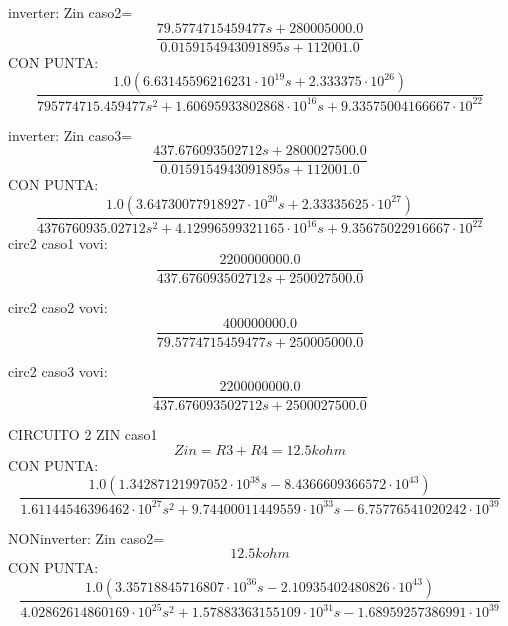 inverter: Zin caso2=
\begin{equation}
\frac{79.5774715459477 s + 280005000.0}{0.0159154943091895 s + 112001.0}
\end{equation}
CON PUNTA:
\begin{equation}
\frac{1.0 \left(6.63145596216231 \cdot 10^{19} s + 2.333375 \cdot 10^{26}\right)}{795774715.459477 s^{2} + 1.60695933802868 \cdot 10^{16} s + 9.33575004166667 \cdot 10^{22}}
\end{equation}

inverter: Zin caso3=
\begin{equation}
\frac{437.676093502712 s + 2800027500.0}{0.0159154943091895 s + 112001.0}
\end{equation}
CON PUNTA:
\begin{equation}
\frac{1.0 \left(3.64730077918927 \cdot 10^{20} s + 2.33335625 \cdot 10^{27}\right)}{4376760935.02712 s^{2} + 4.12996599321165 \cdot 10^{16} s + 9.35675022916667 \cdot 10^{22}}
\end{equation}
circ2 caso1 vovi:
\begin{equation}
\frac{2200000000.0}{437.676093502712 s + 250027500.0}
\end{equation}

circ2 caso2 vovi:
\begin{equation}
\frac{400000000.0}{79.5774715459477 s + 250005000.0}
\end{equation}

circ2 caso3 vovi:
\begin{equation}
\frac{2200000000.0}{437.676093502712 s + 2500027500.0}
\end{equation}

CIRCUITO 2
ZIN
caso1
\begin{equation}
Zin = R3 + R4 = 12.5kohm
\end{equation}
CON PUNTA:
\begin{equation}
\frac{1.0 \left(1.34287121997052 \cdot 10^{38} s - 8.4366609366572 \cdot 10^{43}\right)}{1.61144546396462 \cdot 10^{27} s^{2} + 9.74400011449559 \cdot 10^{33} s - 6.75776541020242 \cdot 10^{39}}
\end{equation}

NONinverter: Zin caso2=
\begin{equation}
12.5kohm
\end{equation}
CON PUNTA:
\begin{equation}
\frac{1.0 \left(3.35718845716807 \cdot 10^{36} s - 2.10935402480826 \cdot 10^{43}\right)}{4.02862614860169 \cdot 10^{25} s^{2} + 1.57883363155109 \cdot 10^{31} s - 1.68959257386991 \cdot 10^{39}}
\end{equation}

